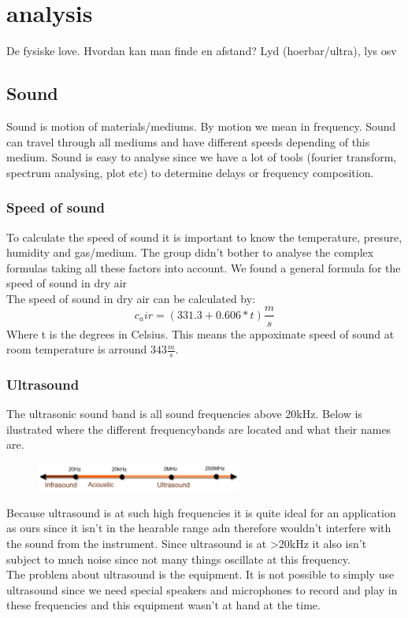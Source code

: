 \chapter{analysis}
De fysiske love. Hvordan kan man finde en afstand? Lyd (hoerbar/ultra), lys osv

\section{Sound}
Sound is motion of materials/mediums. By motion we mean in frequency. Sound can travel through all mediums and have different speeds depending of this medium. Sound is easy to analyse since we have a lot of tools (fourier transform, spectrum analysing, plot etc) to determine delays or frequency composition.
\subsection{Speed of sound}
To calculate the speed of sound it is important to know the temperature, presure, humidity and gas/medium. The group didn't bother to analyse the complex formulas taking all these factors into account. We found a general formula for the speed of sound in dry air\\
The speed of sound in dry air can be calculated by:
\begin{equation}
c_air=(331.3+0.606*t)\frac{m}{s}
\end{equation}
Where t is the degrees in Celsius. This means the appoximate speed of sound at room temperature is arround $343\frac{m}{s}$.\\
\subsection{Ultrasound}
The ultrasonic sound band is all sound frequencies above 20kHz. Below is ilustrated where the different frequencybands are located and what their names are.
\begin{figure}[H]
\centering
\includegraphics[width=0.6\textwidth]{billeder/frequencybands.png}
\end{figure}
Because ultrasound is at such high frequencies it is quite ideal for an application as ours since it isn't in the hearable range adn therefore wouldn't interfere with the sound from the instrument. Since ultrasound is at >20kHz it also isn't subject to much noise since not many things oscillate at this frequency.\\
The problem about ultrasound is the equipment. It is not possible to simply use ultrasound since we need special speakers and microphones to record and play in these frequencies and this equipment wasn't at hand at the time.
